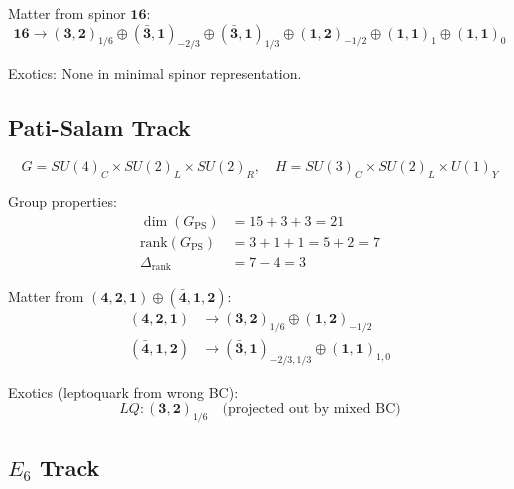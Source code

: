 \documentclass[11pt,a4paper]{article}
\begin{document}
Matter from spinor $\mathbf{16}$:
\begin{equation}
\label{eq:so10-16-decomp}
\mathbf{16} \to (\mathbf{3}, \mathbf{2})_{1/6} \oplus (\bar{\mathbf{3}}, \mathbf{1})_{-2/3}
\oplus (\bar{\mathbf{3}}, \mathbf{1})_{1/3} \oplus (\mathbf{1}, \mathbf{2})_{-1/2}
\oplus (\mathbf{1}, \mathbf{1})_1 \oplus (\mathbf{1}, \mathbf{1})_0
\end{equation}

Exotics: None in minimal spinor representation.

\subsection{Pati-Salam Track}
\label{subsec:ps-track}

\begin{equation}
\label{eq:ps-group}
G = SU(4)_C \times SU(2)_L \times SU(2)_R, \quad H = SU(3)_C \times SU(2)_L \times U(1)_Y
\end{equation}

Group properties:
\begin{align}
\label{eq:ps-dim}
\dim(G_{\text{PS}}) &= 15 + 3 + 3 = 21 \\
\label{eq:ps-rank}
\text{rank}(G_{\text{PS}}) &= 3 + 1 + 1 = 5 + 2 = 7 \\
\label{eq:ps-rank-drop}
\Delta_{\text{rank}} &= 7 - 4 = 3
\end{align}

Matter from $(\mathbf{4}, \mathbf{2}, \mathbf{1}) \oplus (\bar{\mathbf{4}}, \mathbf{1}, \mathbf{2})$:
\begin{equation}
\label{eq:ps-matter}
\begin{aligned}
(\mathbf{4}, \mathbf{2}, \mathbf{1}) &\to (\mathbf{3}, \mathbf{2})_{1/6} \oplus (\mathbf{1}, \mathbf{2})_{-1/2} \\
(\bar{\mathbf{4}}, \mathbf{1}, \mathbf{2}) &\to (\bar{\mathbf{3}}, \mathbf{1})_{-2/3,1/3} \oplus (\mathbf{1}, \mathbf{1})_{1,0}
\end{aligned}
\end{equation}

Exotics (leptoquark from wrong BC):
\begin{equation}
\label{eq:ps-exotics}
LQ : (\mathbf{3}, \mathbf{2})_{1/6} \quad \text{(projected out by mixed BC)}
\end{equation}

\subsection{$E_6$ Track}
\label{subsec:e6-track}
\end{document}
